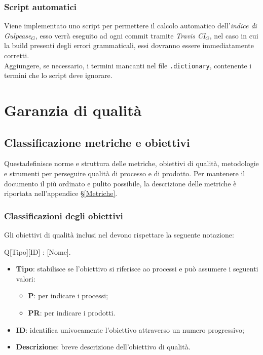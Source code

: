 \subsubsection{Script automatici}
Viene implementato uno script per permettere il calcolo automatico dell'\textit{indice di Gulpease$_{G}$}, esso verrà eseguito ad ogni commit tramite \textit{Travis CI$_{G}$}, nel caso in cui la build presenti degli errori grammaticali, essi dovranno essere immediatamente corretti.\\
Aggiungere, se necessario, i termini mancanti nel file \texttt{.dictionary}, contenente i termini che lo script deve ignorare.

\section{Garanzia di qualità}
\subsection{Classificazione metriche e obiettivi}
\label{MetricheObbiettivi}
Questadefinisce norme e struttura delle metriche, obiettivi di qualità, metodologie e strumenti per perseguire qualità di processo e di prodotto. 
Per mantenere il documento il più ordinato e pulito possibile, la descrizione delle metriche è riportata nell'appendice \S\ref{Metriche}.
\subsubsection{Classificazioni degli obiettivi} 
Gli obiettivi di qualità inclusi nel \pianodiqualifica devono rispettare la seguente notazione: \\
\begin{center}
Q[Tipo][ID] : [Nome].
\end{center}
\begin{itemize}
	\item \textbf{Tipo}: stabilisce se l'obiettivo si riferisce ao processi e può assumere i seguenti valori:
	\begin{itemize}
		\item \textbf{P}: per indicare i processi;
		\item \textbf{PR}: per indicare i prodotti.
	\end{itemize}
	\item \textbf{ID}: identifica univocamente l'obiettivo attraverso un numero progressivo;
	\item \textbf{Descrizione}: breve descrizione dell'obiettivo di qualità.
\end{itemize}
